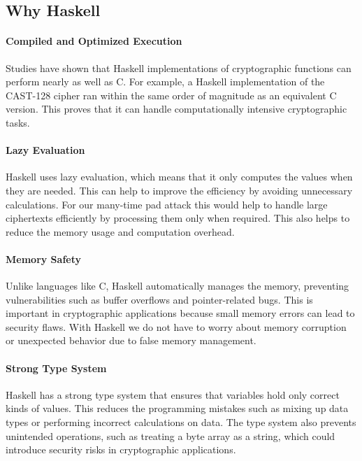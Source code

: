 \subsection{Why Haskell}\label{sec:why_haskell}

\paragraph{Compiled and Optimized Execution} Studies have shown that Haskell implementations of cryptographic functions can perform nearly as well as C. 
For example, a Haskell implementation of the CAST-128 cipher ran within the same order of magnitude as an equivalent C version. 
This proves that it can handle computationally intensive cryptographic tasks.

\paragraph{Lazy Evaluation} Haskell uses lazy evaluation, which means that it only computes the values when they are needed.
This can help to improve the efficiency by avoiding unnecessary calculations. 
For our many-time pad attack this would help to handle large ciphertexts efficiently by processing them only when required.
This also helps to reduce the memory usage and computation overhead.

\paragraph{Memory Safety}
Unlike languages like C, Haskell automatically manages the memory, preventing vulnerabilities such as buffer overflows and pointer-related bugs.
This is important in cryptographic applications because small memory errors can lead to security flaws. 
With Haskell we do not have to worry about memory corruption or unexpected behavior due to false memory management.

\paragraph{Strong Type System}
Haskell has a strong type system that ensures that variables hold only correct kinds of values. 
This reduces the programming mistakes such as mixing up data types or performing incorrect calculations on data.
The type system also prevents unintended operations, such as treating a byte array as a string, which could introduce security risks in cryptographic applications.

